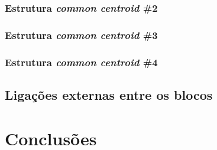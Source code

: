 \documentclass[11pt]{article}
\numberwithin{equation}{section}
\begin{document}
\subsubsection{Estrutura \textit{common centroid} \#2}

\subsubsection{Estrutura \textit{common centroid} \#3}

\subsubsection{Estrutura \textit{common centroid} \#4}

\subsection{Ligações externas entre os blocos}

\pagebreak

\section{Conclusões}
\end{document}
